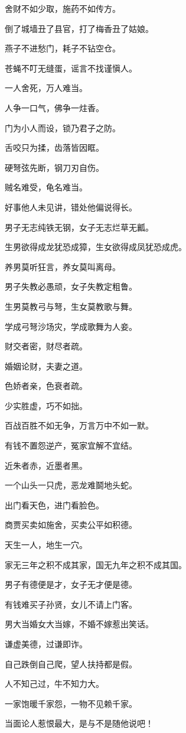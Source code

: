 \documentclass[12pt,oneside]{book}
\begin{document}
舍财不如少取，施药不如传方。

倒了城墙丑了县官，打了梅香丑了姑娘。

燕子不进愁门，耗子不钻空仓。

苍蝇不叮无缝蛋，谣言不找谨愼人。

一人舍死，万人难当。

人争一口气，佛争一炷香。

门为小人而设，锁乃君子之防。

舌咬只为揉，齿落皆因眶。

硬弩弦先断，钢刀刃自伤。

贼名难受，龟名难当。

好事他人未见讲，错处他偏说得长。

男子无志纯铁无钢，女子无志烂草无瓤。

生男欲得成龙犹恐成獐，生女欲得成凤犹恐成虎。

养男莫听狂言，养女莫叫离母。

男子失教必愚顽，女子失教定粗鲁。

生男莫教弓与弩，生女莫教歌与舞。

学成弓弩沙场灾，学成歌舞为人妾。

财交者密，财尽者疏。

婚姻论财，夫妻之道。

色娇者亲，色衰者疏。

少实胜虚，巧不如拙。

百战百胜不如无争，万言万中不如一默。

有钱不置怨逆产，冤家宜解不宜结。

近朱者赤，近墨者黑。

一个山头一只虎，恶龙难鬬地头蛇。

出门看天色，进门看脸色。

商贾买卖如施舍，买卖公平如积德。

天生一人，地生一穴。

家无三年之积不成其家，国无九年之积不成其国。

男子有德便是才，女子无才便是德。

有钱难买子孙贤，女儿不请上门客。

男大当婚女大当嫁，不婚不嫁惹出笑话。

谦虚美德，过谦即诈。

自己跌倒自己爬，望人扶持都是假。

人不知己过，牛不知力大。

一家饱暖千家怨，一物不见赖千家。

当面论人惹恨最大，是与不是随他说吧！
\end{document}
